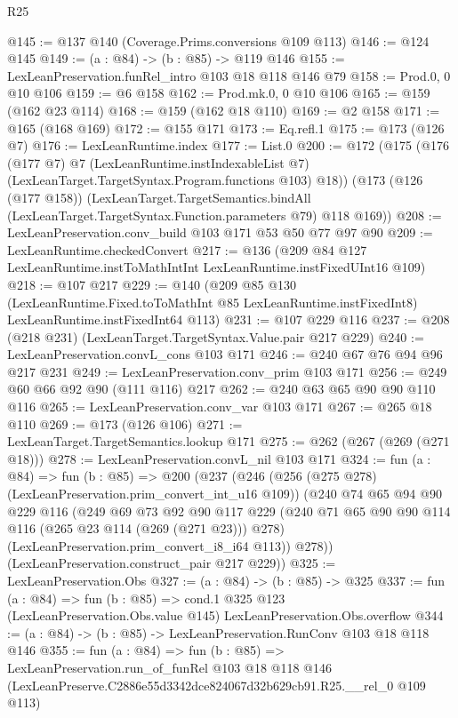 \begin{lexlean}{R25}
\begin{coremodule}
@145 := @137 @140 (Coverage.Prims.conversions @109 @113)
@146 := @124 @145
@149 := (a : @84) -> (b : @85) -> @119 @146
@155 := LexLeanPreservation.funRel_intro @103 @18 @118 @146 @79
@158 := Prod.{0, 0} @10 @106
@159 := @6 @158
@162 := Prod.mk.{0, 0} @10 @106
@165 := @159 (@162 @23 @114)
@168 := @159 (@162 @18 @110)
@169 := @2 @158
@171 := @165 (@168 @169)
@172 := @155 @171
@173 := Eq.refl.{1}
@175 := @173 (@126 @7)
@176 := LexLeanRuntime.index
@177 := List.{0}
@200 := @172
    (@175
      (@176
        (@177 @7)
        @7
        (LexLeanRuntime.instIndexableList @7)
        (LexLeanTarget.TargetSyntax.Program.functions @103)
        @18))
    (@173
      (@126 (@177 @158))
      (LexLeanTarget.TargetSemantics.bindAll
        (LexLeanTarget.TargetSyntax.Function.parameters @79)
        @118
        @169))
@208 := LexLeanPreservation.conv_build @103 @171 @53 @50 @77 @97 @90
@209 := LexLeanRuntime.checkedConvert
@217 := @136 (@209 @84 @127 LexLeanRuntime.instToMathIntInt LexLeanRuntime.instFixedUInt16 @109)
@218 := @107 @217
@229 := @140
    (@209
      @85
      @130
      (LexLeanRuntime.Fixed.toToMathInt @85 LexLeanRuntime.instFixedInt8)
      LexLeanRuntime.instFixedInt64
      @113)
@231 := @107 @229 @116
@237 := @208 (@218 @231) (LexLeanTarget.TargetSyntax.Value.pair @217 @229)
@240 := LexLeanPreservation.convL_cons @103 @171
@246 := @240 @67 @76 @94 @96 @217 @231
@249 := LexLeanPreservation.conv_prim @103 @171
@256 := @249 @60 @66 @92 @90 (@111 @116) @217
@262 := @240 @63 @65 @90 @90 @110 @116
@265 := LexLeanPreservation.conv_var @103 @171
@267 := @265 @18 @110
@269 := @173 (@126 @106)
@271 := LexLeanTarget.TargetSemantics.lookup @171
@275 := @262 (@267 (@269 (@271 @18)))
@278 := LexLeanPreservation.convL_nil @103 @171
@324 := fun (a : @84) =>
  fun (b : @85) =>
  @200
    (@237
      (@246
        (@256 (@275 @278) (LexLeanPreservation.prim_convert_int_u16 @109))
        (@240
          @74
          @65
          @94
          @90
          @229
          @116
          (@249
            @69
            @73
            @92
            @90
            @117
            @229
            (@240 @71 @65 @90 @90 @114 @116 (@265 @23 @114 (@269 (@271 @23))) @278)
            (LexLeanPreservation.prim_convert_i8_i64 @113))
          @278))
      (LexLeanPreservation.construct_pair @217 @229))
@325 := LexLeanPreservation.Obs
@327 := (a : @84) -> (b : @85) -> @325
@337 := fun (a : @84) =>
  fun (b : @85) =>
  cond.{1} @325 @123 (LexLeanPreservation.Obs.value @145) LexLeanPreservation.Obs.overflow
@344 := (a : @84) -> (b : @85) -> LexLeanPreservation.RunConv @103 @18 @118 @146
@355 := fun (a : @84) =>
  fun (b : @85) =>
  LexLeanPreservation.run_of_funRel
    @103
    @18
    @118
    @146
    (LexLeanPreserve.C2886e55d3342dce824067d32b629cb91.R25.__rel_0 @109 @113)
\end{coremodule}
\end{lexlean}
